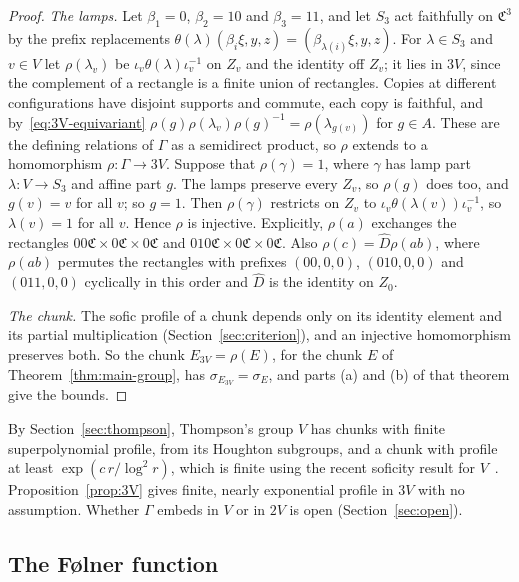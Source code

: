 \begin{proof}
\emph{The lamps.} Let $\beta_1=0$, $\beta_2=10$ and $\beta_3=11$, and let $S_3$ act faithfully on $\mathfrak C^3$ by the prefix replacements
$\theta(\lambda)(\beta_i\xi,y,z)=(\beta_{\lambda(i)}\xi,y,z)$. For $\lambda\in S_3$ and $v\in V$ let $\rho(\lambda_v)$ be $\iota_v\theta(\lambda)\iota_v^{-1}$ on
$Z_v$ and the identity off $Z_v$; it lies in $3V$, since the complement of a rectangle is a finite union of rectangles. Copies at different
configurations have disjoint supports and commute, each copy is faithful, and by~\eqref{eq:3V-equivariant}
$\rho(g)\rho(\lambda_v)\rho(g)^{-1}=\rho(\lambda_{g(v)})$ for $g\in A$. These are the defining relations of $\Gamma$ as a semidirect product, so $\rho$
extends to a homomorphism $\rho:\Gamma\to3V$. Suppose that $\rho(\gamma)=1$, where $\gamma$ has lamp part $\lambda:V\to S_3$ and affine part $g$. The
lamps preserve every $Z_v$, so $\rho(g)$ does too, and $g(v)=v$ for all $v$; so $g=1$. Then $\rho(\gamma)$ restricts on $Z_v$ to
$\iota_v\theta(\lambda(v))\iota_v^{-1}$, so $\lambda(v)=1$ for all $v$. Hence $\rho$ is injective. Explicitly, $\rho(a)$ exchanges the rectangles
$00\mathfrak C\times0\mathfrak C\times0\mathfrak C$ and $010\mathfrak C\times0\mathfrak C\times0\mathfrak C$. Also $\rho(c)=\hat D\rho(ab)$, where
$\rho(ab)$ permutes the rectangles with prefixes $(00,0,0)$, $(010,0,0)$ and $(011,0,0)$ cyclically in this order and $\hat D$ is the identity on
$Z_0$.

\emph{The chunk.} The sofic profile of a chunk depends only on its identity element and its partial multiplication
(Section~\ref{sec:criterion}), and an injective homomorphism preserves both. So the chunk $E_{3V}=\rho(E)$, for the chunk $E$ of
Theorem~\ref{thm:main-group}, has $\sigma_{E_{3V}}=\sigma_E$, and parts (a) and (b) of that theorem give the bounds.
\end{proof}

By Section~\ref{sec:thompson}, Thompson's group $V$ has chunks with finite superpolynomial profile, from its Houghton subgroups, and a chunk with
profile at least $\exp(c\,r/\log^2r)$, which is finite using the recent soficity result for $V$~\cite[Theorem~1.1]{CJM2026}. Proposition~\ref{prop:3V} gives finite, nearly exponential profile in
$3V$ with no assumption. Whether $\Gamma$ embeds in $V$ or in $2V$ is open (Section~\ref{sec:open}).

\subsection{The F\o lner function}\label{sec:folner}

